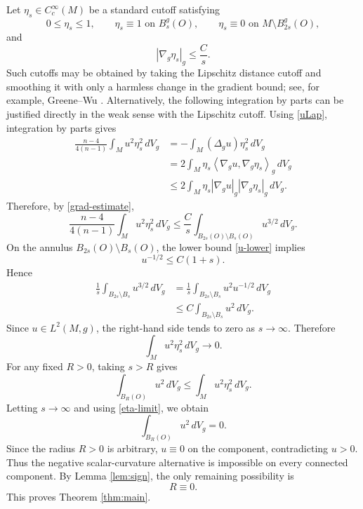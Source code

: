 \documentclass[11pt]{amsart}
\numberwithin{equation}{section}
\newcommand{\ip}[2]{\left\langle #1,#2\right\rangle}
\newcommand{\norm}[1]{\left|#1\right|}
\begin{document}
Let $\eta_s\in C_c^\infty(M)$ be a standard cutoff satisfying
$$
        0\leq\eta_s\leq1,
        \qquad
        \eta_s\equiv1\text{ on }B_s^g(O),
        \qquad
        \eta_s\equiv0\text{ on }M\setminus B_{2s}^g(O),
$$
and
$$
        \norm{\nabla_g\eta_s}_g\leq\frac{C}{s} .
$$
Such cutoffs may be obtained by taking the Lipschitz distance cutoff and smoothing it with only a harmless change in the gradient bound; see, for example, Greene--Wu \cite{GreeneWu}.  Alternatively, the following integration by parts can be justified directly in the weak sense with the Lipschitz cutoff.  Using \eqref{uLap}, integration by parts gives
\begin{align*}
        \frac{n-4}{4(n-1)}\int_M u^2\eta_s^2\,dV_g
        &= -\int_M (\Delta_g u)\eta_s^2\,dV_g \\
        &= 2\int_M \eta_s\ip{\nabla_g u}{\nabla_g\eta_s}_g\,dV_g \\
        &\leq 2\int_M \eta_s\norm{\nabla_g u}_g\norm{\nabla_g\eta_s}_g\,dV_g .
\end{align*}
Therefore, by \eqref{grad-estimate},
\begin{equation}\label{cutoff-ineq1}
        \frac{n-4}{4(n-1)}\int_M u^2\eta_s^2\,dV_g
        \leq
        \frac{C}{s}\int_{B_{2s}(O)\setminus B_s(O)}u^{3/2}\,dV_g .
\end{equation}
On the annulus $B_{2s}(O)\setminus B_s(O)$, the lower bound \eqref{u-lower} implies
$$
        u^{-1/2}\leq C(1+s).
$$
Hence
\begin{align*}
        \frac1s\int_{B_{2s}\setminus B_s}u^{3/2}\,dV_g
        &=\frac1s\int_{B_{2s}\setminus B_s}u^2u^{-1/2}\,dV_g \\
        &\leq C\int_{B_{2s}\setminus B_s}u^2\,dV_g .
\end{align*}
Since $u\in L^2(M,g)$, the right-hand side tends to zero as $s\to\infty$.  Therefore
\begin{equation}\label{eta-limit}
        \int_M u^2\eta_s^2\,dV_g\to0 .
\end{equation}
For any fixed $R>0$, taking $s>R$ gives
$$
        \int_{B_R(O)}u^2\,dV_g
        \leq
        \int_M u^2\eta_s^2\,dV_g .
$$
Letting $s\to\infty$ and using \eqref{eta-limit}, we obtain
$$
        \int_{B_R(O)}u^2\,dV_g=0 .
$$
Since the radius $R>0$ is arbitrary, $u\equiv0$ on the component, contradicting $u>0$.  Thus the negative scalar-curvature alternative is impossible on every connected component.  By Lemma \ref{lem:sign}, the only remaining possibility is
$$
        R\equiv0 .
$$
This proves Theorem \ref{thm:main}.
\end{document}
